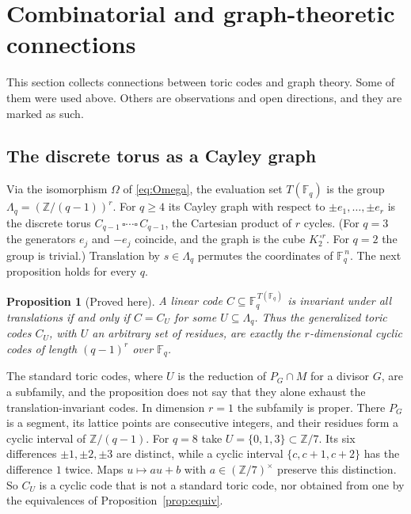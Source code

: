 \documentclass[12pt,letterpaper]{article}
\numberwithin{equation}{section}
\newtheorem{proposition}[theorem]{Proposition}
\theoremstyle{definition}
\theoremstyle{remark}
\newcommand{\Z}{\mathbb{Z}}
\newcommand{\Fq}{\mathbb{F}_q}
\newcommand{\Lq}{\Lambda_q}
\begin{document}
\section{Combinatorial and graph-theoretic connections}\label{sec:graphs}

This section collects connections between toric codes and graph theory. Some
of them were used above. Others are observations and open directions, and
they are marked as such.

\subsection{The discrete torus as a Cayley graph}\label{sec:cayley}

Via the isomorphism $\Omega$ of \eqref{eq:Omega}, the evaluation set $T(\Fq)$
is the group $\Lq=(\Z/(q-1))^r$. For
$q\ge4$ its Cayley graph with respect to $\pm e_1,\dots,\pm e_r$ is the
discrete torus $C_{q-1}\,\square\cdots\square\,C_{q-1}$, the Cartesian product
of $r$ cycles. (For $q=3$ the generators $e_j$ and $-e_j$ coincide, and the
graph is the cube $K_2^{\,\square r}$. For $q=2$ the group is trivial.)
Translation by $s\in\Lq$ permutes the coordinates of $\Fq^{\,n}$. The next
proposition holds for every $q$.

\begin{proposition}[Proved here]\label{prop:cyclic}
A linear code $C\subseteq\Fq^{\,T(\Fq)}$ is invariant under all translations
if and only if $C=C_U$ for some $U\subseteq\Lq$. Thus the generalized toric
codes $C_U$, with $U$ an arbitrary set of residues, are exactly the
$r$-dimensional cyclic codes of length $(q-1)^r$ over $\Fq$.
\end{proposition}

The standard toric codes, where $U$ is the reduction of $P_G\cap M$ for a
divisor $G$, are a subfamily, and the proposition does not say that they
alone exhaust the translation-invariant codes. In dimension $r=1$ the
subfamily is proper. There $P_G$ is a segment, its lattice points are
consecutive integers, and their residues form a cyclic interval of
$\Z/(q-1)$. For $q=8$ take $U=\{0,1,3\}\subset\Z/7$. Its six differences
$\pm1,\pm2,\pm3$ are distinct, while a cyclic interval $\{c,c+1,c+2\}$ has the
difference $1$ twice. Maps $u\mapsto au+b$ with $a\in(\Z/7)^\times$ preserve
this distinction. So $C_U$ is a cyclic code that is not a standard toric code,
nor obtained from one by the equivalences of Proposition~\ref{prop:equiv}.
\end{document}
